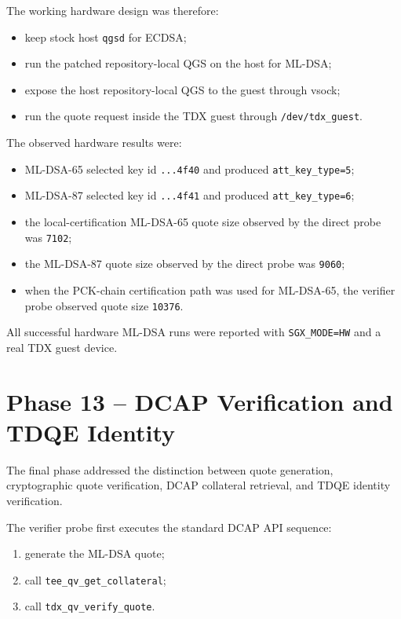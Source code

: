 The working hardware design was therefore:

\begin{itemize}
  \item keep stock host \texttt{qgsd} for ECDSA;
  \item run the patched repository-local QGS on the host for ML-DSA;
  \item expose the host repository-local QGS to the guest through vsock;
  \item run the quote request inside the TDX guest through
        \texttt{/dev/tdx\_guest}.
\end{itemize}

The observed hardware results were:

\begin{itemize}
  \item ML-DSA-65 selected key id \texttt{...4f40} and produced
        \texttt{att\_key\_type=5};
  \item ML-DSA-87 selected key id \texttt{...4f41} and produced
        \texttt{att\_key\_type=6};
  \item the local-certification ML-DSA-65 quote size observed by the direct
        probe was \texttt{7102};
  \item the ML-DSA-87 quote size observed by the direct probe was
        \texttt{9060};
  \item when the PCK-chain certification path was used for ML-DSA-65, the
        verifier probe observed quote size \texttt{10376}.
\end{itemize}

All successful hardware ML-DSA runs were reported with \texttt{SGX\_MODE=HW}
and a real TDX guest device.

\section{Phase 13 -- DCAP Verification and TDQE Identity}

The final phase addressed the distinction between quote generation,
cryptographic quote verification, DCAP collateral retrieval, and TDQE identity
verification.

The verifier probe first executes the standard DCAP API sequence:

\begin{enumerate}
  \item generate the ML-DSA quote;
  \item call \texttt{tee\_qv\_get\_collateral};
  \item call \texttt{tdx\_qv\_verify\_quote}.
\end{enumerate}

